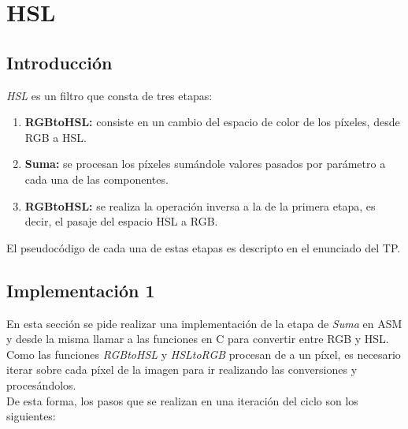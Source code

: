 \section{HSL}
\subsection{Introducción}
\textit{HSL} es un filtro que consta de tres etapas:
\begin{enumerate}
\item \textbf{RGBtoHSL:} consiste en un cambio del espacio de color de los píxeles, desde RGB a HSL. 
\item \textbf{Suma:} se procesan los píxeles sumándole valores pasados por parámetro a cada una de las componentes.
\item \textbf{RGBtoHSL:} se realiza la operación inversa a la de la primera etapa, es decir, el pasaje del espacio HSL a RGB.
\end{enumerate}

El pseudocódigo de cada una de estas etapas es descripto en el enunciado del TP.

\subsection{Implementación 1}
En esta sección se pide realizar una implementación de la etapa de \textit{Suma} en ASM y desde la misma llamar a las funciones en C para convertir entre RGB y HSL.\\
Como las funciones \textit{RGBtoHSL} y \textit{HSLtoRGB} procesan de a un píxel, es necesario iterar sobre cada píxel de la imagen para ir realizando las conversiones y procesándolos.\\

De esta forma, los pasos que se realizan en una iteración del ciclo son los siguientes:


